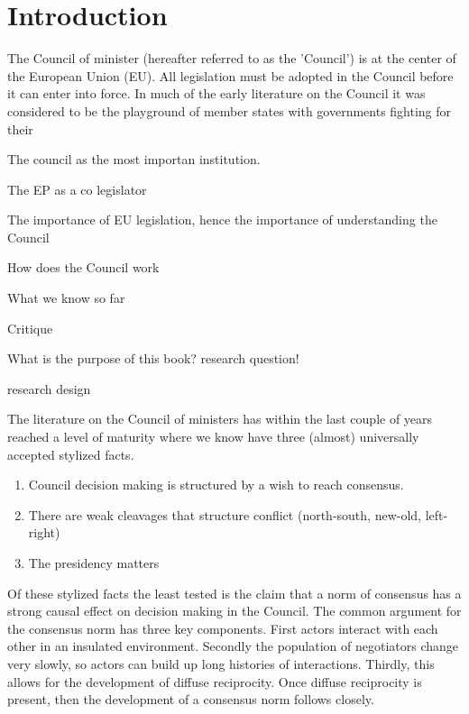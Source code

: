 \chapter{Introduction}
The Council of minister (hereafter referred to as the 'Council') is at the center of the European Union (EU). All legislation must be adopted in the Council before it can enter into force. In much of the early literature on the Council it was considered to be the playground of member states with governments fighting for their 

The council as the most importan institution.

The EP as a co legislator

The importance of EU legislation, hence the importance of understanding the Council

How does the Council work

What we know so far

Critique

What is the purpose of this book? research question!

research design




The literature on the Council of ministers has within the last couple of years reached a level of maturity where we know have three (almost) universally accepted stylized facts.

\begin{enumerate}
\item Council decision making is structured by a wish to reach consensus.
\item There are weak cleavages that structure conflict (north-south, new-old, left-right)
\item The presidency matters
\end{enumerate}

Of these stylized facts the least tested is the claim that a norm of consensus has a strong causal effect on decision making in the Council. The common argument for the consensus norm has three key components. First actors interact with each other in an insulated environment. Secondly the population of negotiators change very slowly, so actors can build up long histories of interactions. Thirdly, this allows for the development of diffuse reciprocity. Once diffuse reciprocity is present, then the development of a consensus norm follows closely. 


